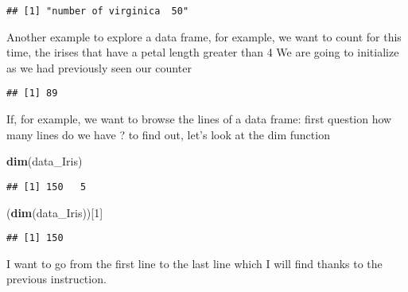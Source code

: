 \documentclass[
]{article}
\newenvironment{Shaded}{\begin{snugshade}}{\end{snugshade}}
\newcommand{\ControlFlowTok}[1]{\textcolor[rgb]{0.13,0.29,0.53}{\textbf{#1}}}
\newcommand{\DecValTok}[1]{\textcolor[rgb]{0.00,0.00,0.81}{#1}}
\newcommand{\FunctionTok}[1]{\textcolor[rgb]{0.13,0.29,0.53}{\textbf{#1}}}
\newcommand{\NormalTok}[1]{#1}
\newcommand{\OtherTok}[1]{\textcolor[rgb]{0.56,0.35,0.01}{#1}}
\newcommand{\SpecialCharTok}[1]{\textcolor[rgb]{0.81,0.36,0.00}{\textbf{#1}}}
\begin{document}
\begin{verbatim}
## [1] "number of virginica  50"
\end{verbatim}

Another example to explore a data frame, for example, we want to count
for this time, the irises that have a petal length greater than 4 We are
going to initialize as we had previously seen our counter

\begin{Shaded}
\end{Shaded}

\begin{verbatim}
## [1] 89
\end{verbatim}

If, for example, we want to browse the lines of a data frame: first
question how many lines do we have ? to find out, let's look at the dim
function

\begin{Shaded}
\begin{Highlighting}[]
\FunctionTok{dim}\NormalTok{(data\_Iris)}
\end{Highlighting}
\end{Shaded}

\begin{verbatim}
## [1] 150   5
\end{verbatim}

\begin{Shaded}
\begin{Highlighting}[]
\NormalTok{(}\FunctionTok{dim}\NormalTok{(data\_Iris))[}\DecValTok{1}\NormalTok{]}
\end{Highlighting}
\end{Shaded}

\begin{verbatim}
## [1] 150
\end{verbatim}

I want to go from the first line to the last line which I will find
thanks to the previous instruction.
\end{document}
